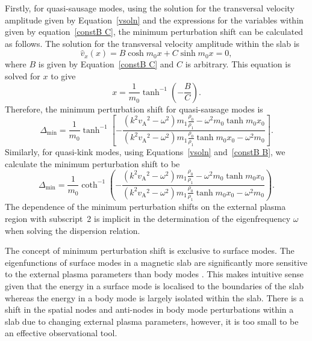 \documentclass[12pt]{../style-files/ociamthesis}
\begin{document}
Firstly, for quasi-sausage modes, using the solution for the transversal velocity amplitude given by Equation~\eqref{vsoln} and the expressions for the variables within given by equation~\eqref{constB C}, the minimum perturbation shift can be calculated as follows. The solution for the transversal velocity amplitude within the slab is
\begin{equation}
\widehat{v}_x(x) = B\cosh{m_0x} + C\sinh{m_0x} = 0,
\end{equation}
where $B$ is given by Equation~\eqref{constB C} and $C$ is arbitrary. This equation is solved for $x$ to give
\begin{equation}
x = \frac{1}{m_0} \tanh^{-1}\left(-\frac{B}{C}\right). \label{disp of min power saus}
\end{equation}
Therefore, the minimum perturbation shift for quasi-sausage modes is
\begin{equation}
\Delta_\textrm{min} = \frac{1}{m_0}\tanh^{-1}\left[-\frac{(k^2{v_\textrm{A}}^2 - \omega^2)m_1\frac{\rho_0}{\rho_1} - \omega^2{m_0}\tanh{m_0x_0}}{(k^2{v_\textrm{A}}^2 - \omega^2)m_1\frac{\rho_0}{\rho_1}\tanh{m_0x_0} - \omega^2{m_0}}\right]. \label{shift min saus}
\end{equation}
Similarly, for quasi-kink modes, using Equations~\eqref{vsoln} and~\eqref{constB B}, we calculate the minimum perturbation shift to be
\begin{equation}
\Delta_\textrm{min} = \frac{1}{m_0}\coth^{-1}\left(-\frac{(k^2{v_\textrm{A}}^2 - \omega^2)m_1\frac{\rho_0}{\rho_1} - \omega^2{m_0}\tanh{m_0x_0}}{(k^2{v_\textrm{A}}^2 - \omega^2)m_1\frac{\rho_0}{\rho_1}\tanh{m_0x_0} - \omega^2{m_0}}\right). \label{shift min kink}
\end{equation}
The dependence of the minimum perturbation shifts on the external plasma region with subscript~2 is implicit in the determination of the eigenfrequency $\omega$ when solving the dispersion relation.

The concept of minimum perturbation shift is exclusive to surface modes. The eigenfunctions of surface modes in a magnetic slab are significantly more sensitive to the external plasma parameters than body modes \citep{all_etal17}. This makes intuitive sense given that the energy in a surface mode is localised to the boundaries of the slab whereas the energy in a body mode is largely isolated within the slab. There is a shift in the spatial nodes and anti-nodes in body mode perturbations within a slab due to changing external plasma parameters, however, it is too small to be an effective observational tool.
\end{document}
